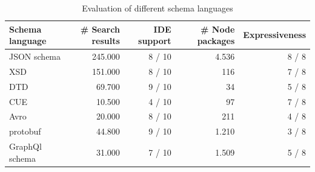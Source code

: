     \begin{table}[]
    \centering
    \caption{Evaluation of different schema languages\label{tab:all}}
        \begin{tabular}{@{}lrrrr@{}}
        \toprule
        \textbf{Schema language} &
          \textbf{\# Search results } &
          \textbf{IDE support} &
          \textbf{\# Node packages} &
          \textbf{Expressiveness} \\ \midrule
        JSON schema &
          245.000 &
          8 / 10 &
          4.536 & 8 / 8  \\
        XSD & 151.000 & 8 / 10 & 116 & 7 / 8 \\
        DTD & 69.700 & 9 / 10 & 34 & 5 / 8\\
        CUE & 10.500 & 4 / 10 & 97 & 7 / 8 \\
        Avro & 20.000 & 8 / 10 & 211 & 4 / 8 \\
        protobuf &  44.800 & 9 / 10 & 1.210 & 3 / 8\\
        GraphQl schema & 31.000 & 7 / 10 & 1.509 & 5 / 8\\ \bottomrule
        \end{tabular}
    \end{table}


